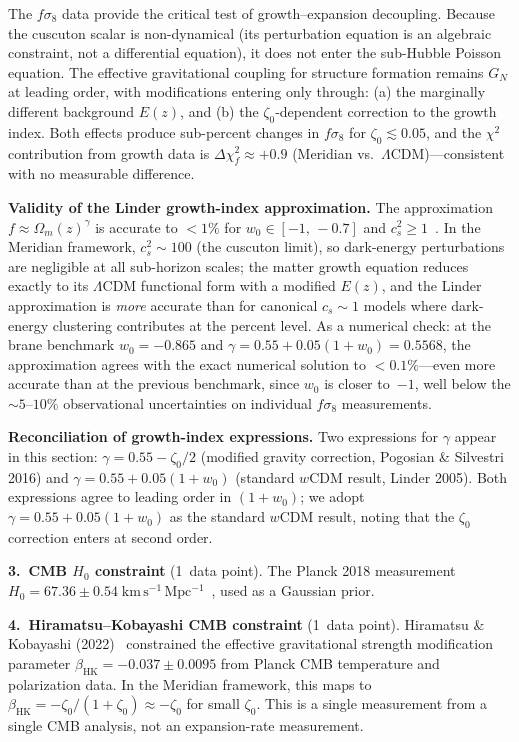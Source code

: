 The $f\sigma_8$ data provide the critical test of growth--expansion decoupling. Because the cuscuton scalar is non-dynamical (its perturbation equation is an algebraic constraint, not a differential equation), it does not enter the sub-Hubble Poisson equation. The effective gravitational coupling for structure formation remains $G_N$ at leading order, with modifications entering only through: (a) the marginally different background $E(z)$, and (b) the $\zeta_0$-dependent correction to the growth index. Both effects produce sub-percent changes in $f\sigma_8$ for $\zeta_0 \lesssim 0.05$, and the $\chi^2$ contribution from growth data is $\Delta\chi^2_f \approx +0.9$ (Meridian vs.\ $\Lambda$CDM)---consistent with no measurable difference.

\textbf{Validity of the Linder growth-index approximation.} The approximation $f \approx \Omega_m(z)^\gamma$ is accurate to $<1\%$ for $w_0 \in [-1,\,-0.7]$ and $c_s^2 \geq 1$~\cite{ch2:Linder2005}. In the Meridian framework, $c_s^2 \sim 100$ (the cuscuton limit), so dark-energy perturbations are negligible at all sub-horizon scales; the matter growth equation reduces exactly to its $\Lambda$CDM functional form with a modified $E(z)$, and the Linder approximation is \emph{more} accurate than for canonical $c_s \sim 1$ models where dark-energy clustering contributes at the percent level. As a numerical check: at the brane benchmark $w_0 = -0.865$ and $\gamma = 0.55 + 0.05(1+w_0) = 0.5568$, the approximation agrees with the exact numerical solution to $< 0.1\%$---even more accurate than at the previous benchmark, since $w_0$ is closer to~$-1$, well below the $\sim\!5$--$10\%$ observational uncertainties on individual $f\sigma_8$ measurements.

\textbf{Reconciliation of growth-index expressions.} Two expressions for $\gamma$ appear in this section: $\gamma = 0.55 - \zeta_0/2$ (modified gravity correction, Pogosian \& Silvestri 2016) and $\gamma = 0.55 + 0.05(1+w_0)$ (standard $w$CDM result, Linder 2005). Both expressions agree to leading order in $(1+w_0)$; we adopt $\gamma = 0.55 + 0.05(1+w_0)$ as the standard $w$CDM result, noting that the $\zeta_0$ correction enters at second order.

\textbf{3.\ CMB $H_0$ constraint} (1~data point). The Planck 2018 measurement $H_0 = 67.36 \pm 0.54\;\mathrm{km\,s^{-1}\,Mpc^{-1}}$~\cite{ch2:Planck2018}, used as a Gaussian prior.

\textbf{4.\ Hiramatsu--Kobayashi CMB constraint} (1~data point). Hiramatsu \& Kobayashi (2022)~\cite{ch2:Hiramatsu2022} constrained the effective gravitational strength modification parameter $\beta_\mathrm{HK} = -0.037 \pm 0.0095$ from Planck CMB temperature and polarization data. In the Meridian framework, this maps to $\beta_\mathrm{HK} = -\zeta_0/(1+\zeta_0) \approx -\zeta_0$ for small $\zeta_0$. This is a single measurement from a single CMB analysis, not an expansion-rate measurement.

